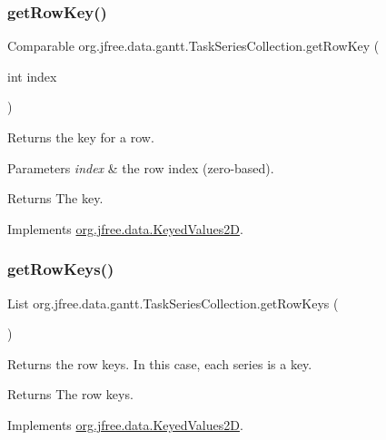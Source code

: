 \subsubsection{\texorpdfstring{get\+Row\+Key()}{getRowKey()}}
{\footnotesize\ttfamily Comparable org.\+jfree.\+data.\+gantt.\+Task\+Series\+Collection.\+get\+Row\+Key (\begin{DoxyParamCaption}\item[{int}]{index }\end{DoxyParamCaption})}

Returns the key for a row.


\begin{DoxyParams}{Parameters}
{\em index} & the row index (zero-\/based).\\
\hline
\end{DoxyParams}
\begin{DoxyReturn}{Returns}
The key. 
\end{DoxyReturn}


Implements \mbox{\hyperlink{interfaceorg_1_1jfree_1_1data_1_1_keyed_values2_d_a7c145e2383036a479460e4bca7b40a95}{org.\+jfree.\+data.\+Keyed\+Values2D}}.

\mbox{\label{classorg_1_1jfree_1_1data_1_1gantt_1_1_task_series_collection_a049adf2f25b6b3b2ea567fe902bf9b76}} 
\subsubsection{\texorpdfstring{get\+Row\+Keys()}{getRowKeys()}}
{\footnotesize\ttfamily List org.\+jfree.\+data.\+gantt.\+Task\+Series\+Collection.\+get\+Row\+Keys (\begin{DoxyParamCaption}{ }\end{DoxyParamCaption})}

Returns the row keys. In this case, each series is a key.

\begin{DoxyReturn}{Returns}
The row keys. 
\end{DoxyReturn}


Implements \mbox{\hyperlink{interfaceorg_1_1jfree_1_1data_1_1_keyed_values2_d_aeda9aab284e61f69ca6e81370e76f70a}{org.\+jfree.\+data.\+Keyed\+Values2D}}.

